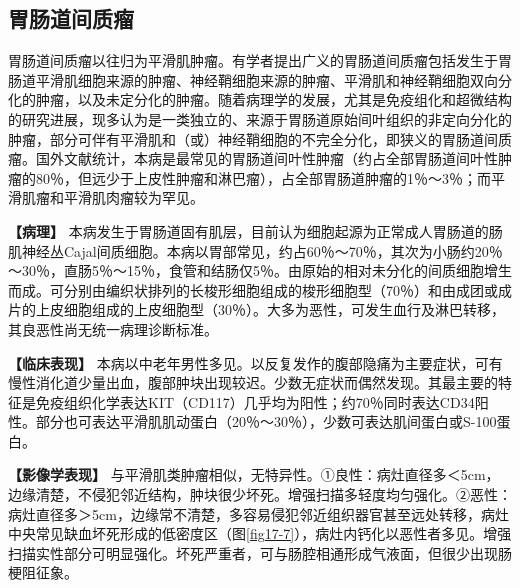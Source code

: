 \subsection{胃肠道间质瘤}

胃肠道间质瘤以往归为平滑肌肿瘤。有学者提出广义的胃肠道间质瘤包括发生于胃肠道平滑肌细胞来源的肿瘤、神经鞘细胞来源的肿瘤、平滑肌和神经鞘细胞双向分化的肿瘤，以及未定分化的肿瘤。随着病理学的发展，尤其是免疫组化和超微结构的研究进展，现多认为是一类独立的、来源于胃肠道原始间叶组织的非定向分化的肿瘤，部分可伴有平滑肌和（或）神经鞘细胞的不完全分化，即狭义的胃肠道间质瘤。国外文献统计，本病是最常见的胃肠道间叶性肿瘤（约占全部胃肠道间叶性肿瘤的80％，但远少于上皮性肿瘤和淋巴瘤），占全部胃肠道肿瘤的1％～3％；而平滑肌瘤和平滑肌肉瘤较为罕见。

\textbf{【病理】}
本病发生于胃肠道固有肌层，目前认为细胞起源为正常成人胃肠道的肠肌神经丛Cajal间质细胞。本病以胃部常见，约占60％～70％，其次为小肠约20％～30％，直肠5％～15％，食管和结肠仅5％。由原始的相对未分化的间质细胞增生而成。可分别由编织状排列的长梭形细胞组成的梭形细胞型（70％）和由成团或成片的上皮细胞组成的上皮细胞型（30％）。大多为恶性，可发生血行及淋巴转移，其良恶性尚无统一病理诊断标准。

\textbf{【临床表现】}
本病以中老年男性多见。以反复发作的腹部隐痛为主要症状，可有慢性消化道少量出血，腹部肿块出现较迟。少数无症状而偶然发现。其最主要的特征是免疫组织化学表达KIT（CD117）几乎均为阳性；约70％同时表达CD34阳性。部分也可表达平滑肌肌动蛋白（20％～30％），少数可表达肌间蛋白或S-100蛋白。

\textbf{【影像学表现】}
与平滑肌类肿瘤相似，无特异性。①良性：病灶直径多＜5cm，边缘清楚，不侵犯邻近结构，肿块很少坏死。增强扫描多轻度均匀强化。②恶性：病灶直径多＞5cm，边缘常不清楚，多容易侵犯邻近组织器官甚至远处转移，病灶中央常见缺血坏死形成的低密度区（图\ref{fig17-7}），病灶内钙化以恶性者多见。增强扫描实性部分可明显强化。坏死严重者，可与肠腔相通形成气液面，但很少出现肠梗阻征象。

